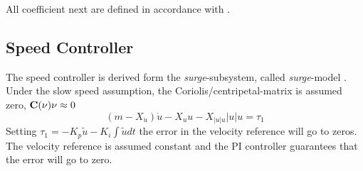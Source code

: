 	All coefficient next are defined in accordance with \cite{SNAME}.
	\subsection{Speed Controller}
		The speed controller is derived form the \textit{surge}-subsystem, called \textit{surge}-model
		\cite{fossen}. Under the slow speed assumption, the Coriolis/centripetal-matrix is assumed
		zero, $\mathbf{C}(\mathbf{\nu})\mathbf{\nu} \approx 0$  
		\begin{equation}
			(m - X_{\dot{u}})\dot{u} - X_u u - X_{|u|u}|u| u = \tau_1
		\end{equation}
		Setting $\tau_1 = -K_p \tilde{u} - K_i \int \tilde{u} dt$ the error in the velocity
		reference will go to zeros. The velocity reference is assumed constant and the PI controller
		guarantees that the error will go to zero.
	
	
	
